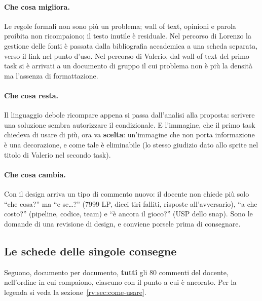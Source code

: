\paragraph{Che cosa migliora.} Le regole formali non sono più un problema;
wall of text, opinioni e parola proibita non ricompaiono; il testo inutile è
residuale. Nel percorso di Lorenzo la gestione delle fonti è passata dalla
bibliografia accademica a una scheda separata, verso il link nel punto
d'uso. Nel percorso di Valerio, dal wall of text del primo task si è arrivati
a un documento di gruppo il cui problema non è più la densità ma l'assenza di
formattazione.

\paragraph{Che cosa resta.} Il linguaggio debole ricompare appena si passa
dall'analisi alla proposta: scrivere una soluzione sembra autorizzare il
condizionale. E l'immagine, che il primo task chiedeva di usare di più, ora va
\textbf{scelta}: un'immagine che non porta informazione è una decorazione, e
come tale è eliminabile (lo stesso giudizio dato allo sprite nel titolo di
Valerio nel secondo task).

\paragraph{Che cosa cambia.} Con il design arriva un tipo di commento nuovo:
il docente non chiede più solo ``che cosa?'' ma ``e se\dots?'' (7999 LP, dieci
tiri falliti, risposte all'avversario), ``a che costo?'' (pipeline, codice,
team) e ``è ancora il gioco?'' (USP dello snap). Sono le domande di una
revisione di design, e conviene porsele prima di consegnare.

\subsection{Le schede delle singole consegne}
\label{rv:t3:sec:schede}

Seguono, documento per documento, \textbf{tutti} gli 80 commenti del docente,
nell'ordine in cui compaiono, ciascuno con il punto a cui è ancorato. Per la
legenda si veda la sezione~\ref{rv:sec:come-usare}.

